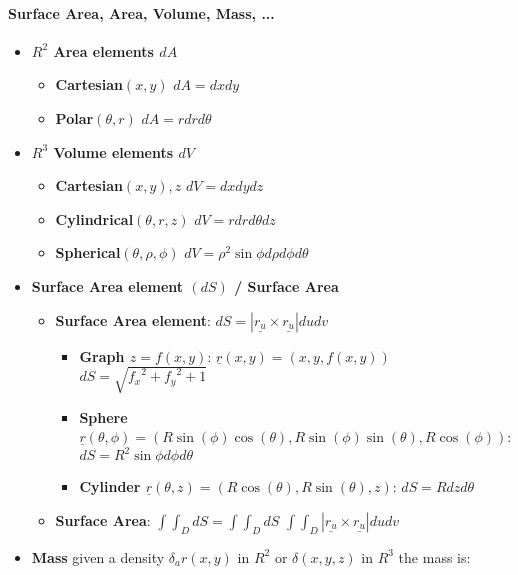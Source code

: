 \documentclass[8pt, twocolumn]{article}
\begin{document}
\paragraph{Surface Area, Area, Volume, Mass, ...}
\begin{itemize}
	\item \textbf{$R^2$ Area elements $d{A}$}
		\begin{itemize}
			\item \textbf{Cartesian$(x, y)$} $dA = dx dy$
			\item \textbf{Polar$(\theta, r)$} $dA = r dr d\theta$
		\end{itemize}
	\item \textbf{$R^3$ Volume elements $d{V}$}
		\begin{itemize}
			\item \textbf{Cartesian$(x, y), z$} $dV = dx dy dz$
			\item \textbf{Cylindrical$(\theta, r, z)$} $dV = r dr d\theta dz$			
			\item \textbf{Spherical$(\theta, \rho, \phi)$} $dV = \rho^2 \sin{\phi} d\rho d\phi d\theta$
		\end{itemize}	
	\item \textbf{Surface Area element $(dS)$ / Surface Area}
		\begin{itemize}

			\item \textbf{Surface Area element}: $dS = |\underline{r_u} \times \underline{r_u}| du dv$
				\begin{itemize}
					\item \textbf{Graph $z = f(x, y)$}: $\underline{r}(x, y) = (x, y, f(x, y))$ $dS = \sqrt{{f_x}^2 + {f_y}^2 + 1} $
					\item \textbf{Sphere $\underline{r}(\theta, \phi) = (R\sin(\phi)\cos(\theta), R\sin(\phi)\sin(\theta), R\cos(\phi))$}: $dS = R^2\sin{\phi}d\phi d\theta$
					\item \textbf{Cylinder $\underline{r}(\theta, z) = (R\cos(\theta), R\sin(\theta),z)$}: $dS = Rdz d\theta$
				\end{itemize}
			\item \textbf{Surface Area}: $\int\int_D{dS} = \int\int_D{dS}$  $\int\int_D{|\underline{r_u} \times \underline{r_u}| du dv} $

		\end{itemize}
	\item \textbf{Mass} given a density $\delta_ar(x, y)$ in  $R^2$ or $\delta(x, y, z)$ in $R^3$  the mass is: 
		\begin{itemize}
		\end{itemize}


	


\end{itemize}
\end{document}

